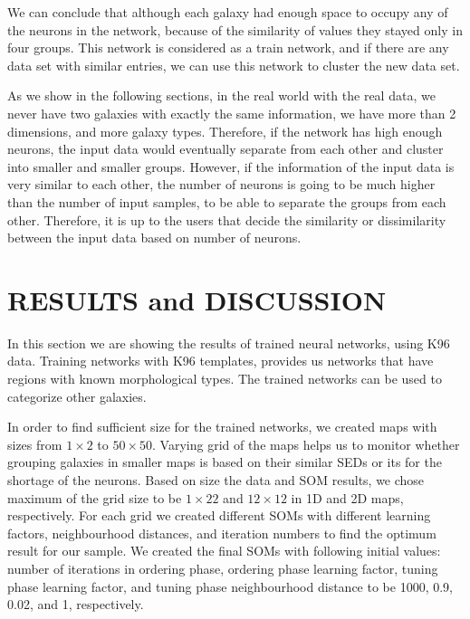 \documentclass[useAMS,usenatbib]{mn2e}
\begin{document}
We can conclude that although each galaxy had enough space to occupy any of the neurons in the network, because of the similarity of values they stayed only in four groups.
This network is considered as a train network, and if there are any data set with similar entries, we can use this network to cluster the new data set.

As we show in the following sections, in the real world with the real data, we never have two galaxies with exactly the same information, we have more than 2 dimensions, and more galaxy types. 
Therefore, if the network has high enough neurons, the input data would eventually separate from each other and cluster into smaller and smaller groups. 
However, if the information of the input data is very similar to each other, the number of neurons is going to be much higher than the number of input samples, to be able to separate the groups from each other. 
Therefore, it is up to the users that decide the similarity or dissimilarity between the input data based on number of neurons. 




\section{RESULTS and DISCUSSION}
\label{sec: result}

    In this section we are showing the results of trained neural networks, using K96 data.
    Training networks with K96 templates, provides us networks that have regions with known morphological types. The trained networks can be used to categorize other galaxies.
    
    In order to find sufficient size for the trained networks, we created maps with sizes from $1\times2$ to $50\times50$.
    Varying grid of the maps helps us to monitor whether grouping galaxies in smaller maps is based on their similar SEDs or its for the shortage of the neurons.
    Based on size the data and SOM results, we chose maximum of the grid size to be $1\times22$ and $12\times12$ in 1D and 2D maps, respectively. 
    For each grid we created different SOMs with different learning factors, neighbourhood distances, and iteration numbers to find the optimum result for our sample.
    We created the final SOMs with following initial values: number of iterations in ordering phase, ordering phase learning factor, tuning phase learning factor, and tuning phase neighbourhood distance to be 1000, 0.9, 0.02, and 1, respectively.
   
\end{document}
